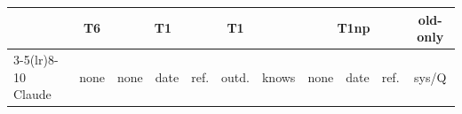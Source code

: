 \begin{tabular}{@{}l c ccc c c ccc c@{}}
\toprule
 & T6 & \multicolumn{3}{c}{T1} & T1 & & \multicolumn{3}{c}{T1np} & old-only \\
\cmidrule(lr){3-5}\cmidrule(lr){8-10}
Claude & none & none & date & ref. & outd. & knows & none & date & ref. & sys/Q \\
\midrule
\bottomrule
\end{tabular}

